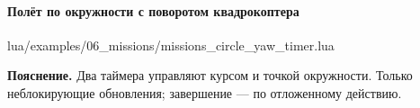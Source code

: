 \paragraph{Полёт по окружности с поворотом квадрокоптера}
\begin{codefile}{lua/examples/06_missions/missions_circle_yaw_timer.lua}
\end{codefile}
\textbf{Пояснение.} Два таймера управляют курсом и точкой окружности. Только неблокирующие обновления; завершение — по отложенному действию.

